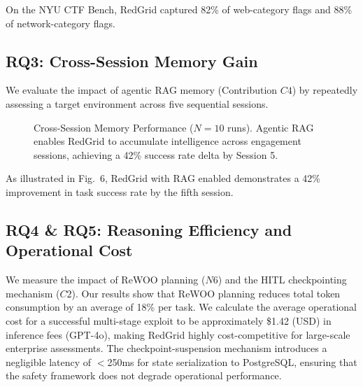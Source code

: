 \documentclass[conference,compsoc]{IEEEtran}
\begin{document}
On the NYU CTF Bench, RedGrid captured 82\% of web-category flags and 88\% of network-category flags.

\subsection{RQ3: Cross-Session Memory Gain}
We evaluate the impact of agentic RAG memory (Contribution $C4$) by repeatedly assessing a target environment across five sequential sessions. 

\begin{figure}[htbp]
\centering
{}
\caption{Cross-Session Memory Performance ($N=10$ runs). Agentic RAG enables RedGrid to accumulate intelligence across engagement sessions, achieving a 42\% success rate delta by Session 5.}
\label{fig:rag_gain}
\end{figure}

As illustrated in Fig.~6, RedGrid with RAG enabled demonstrates a 42\% improvement in task success rate by the fifth session.

\subsection{RQ4 \& RQ5: Reasoning Efficiency and Operational Cost}
We measure the impact of ReWOO planning ($N6$) and the HITL checkpointing mechanism ($C2$). Our results show that ReWOO planning reduces total token consumption by an average of 18\% per task. We calculate the average operational cost for a successful multi-stage exploit to be approximately \$1.42 (USD) in inference fees (GPT-4o), making RedGrid highly cost-competitive for large-scale enterprise assessments. The checkpoint-suspension mechanism introduces a negligible latency of $<$250ms for state serialization to PostgreSQL, ensuring that the safety framework does not degrade operational performance.
\end{document}
